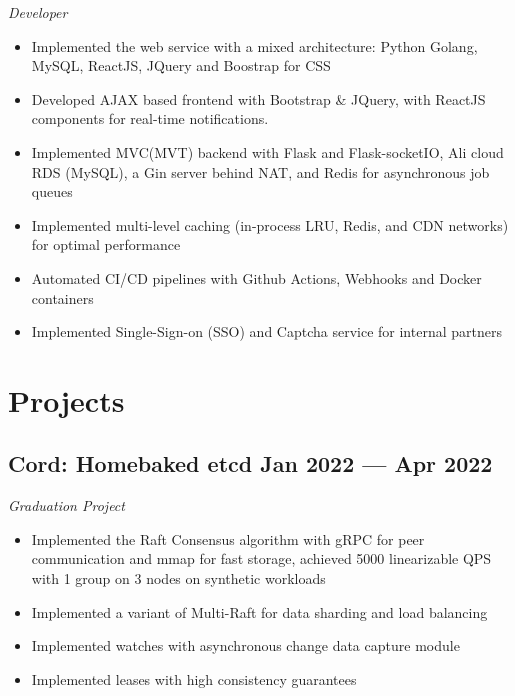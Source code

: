 \documentclass[a4,12pt]{article}
\newcommand{\subtext}[1]{
#1\par\vspace{-0.3cm}}
\newenvironment{zitemize}{
\begin{itemize}\itemsep0pt \parskip0pt \parsep1pt}
{\end{itemize}\vspace{-0.5cm}}
\begin{document}
\subtext{\textit{Developer}}
    \begin{zitemize}
        \item Implemented the web service with a mixed architecture: Python Golang, MySQL, ReactJS, JQuery and Boostrap for CSS
        \item Developed AJAX based frontend with Bootstrap \& JQuery, with ReactJS components for real-time notifications.
        \item Implemented MVC(MVT) backend with Flask and Flask-socketIO, Ali cloud RDS (MySQL), a Gin server behind NAT, and Redis for asynchronous job queues
        \item Implemented multi-level caching (in-process LRU, Redis, and CDN networks) for optimal performance
        \item Automated CI/CD pipelines with Github Actions, Webhooks and Docker containers
        \item Implemented Single-Sign-on (SSO) and Captcha service for internal partners 
    \end{zitemize}

\section{\textbf{Projects}}

\subsection*{Cord: {\normalsize\normalfont Homebaked etcd} \hfill \textbf{Jan 2022 --- Apr 2022}} 
\textit{Graduation Project}
\begin{zitemize}
    \item Implemented the Raft Consensus algorithm with gRPC for peer communication and mmap for fast storage, achieved 5000 linearizable QPS with 1 group on 3 nodes on synthetic workloads
    \item Implemented a variant of Multi-Raft for data sharding and load balancing
    \item Implemented watches with asynchronous change data capture module
    \item Implemented leases with high consistency guarantees
\end{zitemize}


\end{document}
